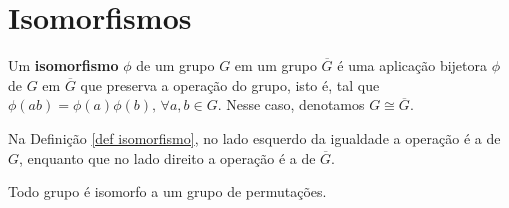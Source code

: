 
\section{Isomorfismos}
    \begin{definition}
	\label{def isomorfismo}
		Um \textbf{isomorfismo} $\phi$ de um grupo $G$ em um grupo
		$\overline{G}$ é uma aplicação bijetora $\phi$ de $G$ em
		$\overline{G}$ que preserva a operação do grupo, isto é, 
		tal que $\phi(ab) = \phi(a)\phi(b), \, \forall a,b\in G$.
		Nesse caso, denotamos $G\cong\overline{G}$.
	\end{definition}
	Na Definição \ref{def isomorfismo}, no lado
	esquerdo da igualdade a operação é a de $G$, enquanto que no lado
	direito a operação é a de $\overline{G}$.
	\begin{theorem}
	\label{Cayley}
		Todo grupo é isomorfo a um grupo de permutações.
	\end{theorem}
